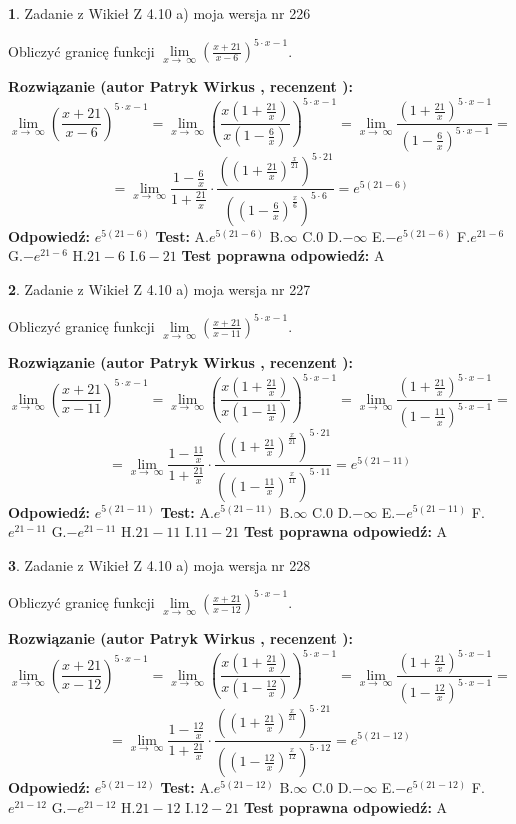 \documentclass[12pt, a4paper]{article}
\theoremstyle{definition} %
\newtheorem{zad}{}
\newcommand{\zadStart}[1]{\begin{zad}#1\newline}
\newcommand{\zadStop}{\end{zad}}
\newcommand{\rozwStart}[2]{\noindent \textbf{Rozwiązanie (autor #1 , recenzent #2): }\newline}
\newcommand{\rozwStop}{\newline}
\newcommand{\odpStart}{\noindent \textbf{Odpowiedź:}\newline}
\newcommand{\odpStop}{\newline}
\newcommand{\testStart}{\noindent \textbf{Test:}\newline}
\newcommand{\testStop}{\newline}
\newcommand{\kluczStart}{\noindent \textbf{Test poprawna odpowiedź:}\newline}
\newcommand{\kluczStop}{\newline}
\begin{document}
\zadStart{Zadanie z Wikieł Z 4.10 a) moja wersja nr 226}


Obliczyć granicę funkcji  $\lim\limits_{x\to\ \infty}(\frac{x+21}{x-6})^{5\cdot x-1}$.
\zadStop
\rozwStart{Patryk Wirkus}{}
$$\lim\limits_{x\to\ \infty}(\frac{x+21}{x-6})^{5\cdot x-1} = \lim\limits_{x\to\ \infty}(\frac{x(1+\frac{21}{x})}{x(1-\frac{6}{x})})^{5\cdot x-1}=\lim\limits_{x\to\ \infty}\frac{(1+\frac{21}{x})^{5\cdot x-1}}{(1-\frac{6}{x})^{5\cdot x-1}}=$$
$$=\lim\limits_{x\to\ \infty}\frac{1-\frac{6}{x}}{1+\frac{21}{x}}\cdot\frac{((1+\frac{21}{x})^{\frac{x}{21}})^{5\cdot21}}{((1-\frac{6}{x})^{\frac{x}{6}})^{5\cdot6}}=e^{5(21-6)}$$
\rozwStop
\odpStart
$e^{5(21-6)}$
\odpStop
\testStart
A.$e^{5(21-6)}$ B.$\infty$ C.$0$ D.$-\infty$ E.$-e^{5(21-6)}$
F.$e^{21-6}$ G.$-e^{21-6}$
H.$21-6$
I.$6-21$
\testStop
\kluczStart
A
\kluczStop



\zadStart{Zadanie z Wikieł Z 4.10 a) moja wersja nr 227}


Obliczyć granicę funkcji  $\lim\limits_{x\to\ \infty}(\frac{x+21}{x-11})^{5\cdot x-1}$.
\zadStop
\rozwStart{Patryk Wirkus}{}
$$\lim\limits_{x\to\ \infty}(\frac{x+21}{x-11})^{5\cdot x-1} = \lim\limits_{x\to\ \infty}(\frac{x(1+\frac{21}{x})}{x(1-\frac{11}{x})})^{5\cdot x-1}=\lim\limits_{x\to\ \infty}\frac{(1+\frac{21}{x})^{5\cdot x-1}}{(1-\frac{11}{x})^{5\cdot x-1}}=$$
$$=\lim\limits_{x\to\ \infty}\frac{1-\frac{11}{x}}{1+\frac{21}{x}}\cdot\frac{((1+\frac{21}{x})^{\frac{x}{21}})^{5\cdot21}}{((1-\frac{11}{x})^{\frac{x}{11}})^{5\cdot11}}=e^{5(21-11)}$$
\rozwStop
\odpStart
$e^{5(21-11)}$
\odpStop
\testStart
A.$e^{5(21-11)}$ B.$\infty$ C.$0$ D.$-\infty$ E.$-e^{5(21-11)}$
F.$e^{21-11}$ G.$-e^{21-11}$
H.$21-11$
I.$11-21$
\testStop
\kluczStart
A
\kluczStop



\zadStart{Zadanie z Wikieł Z 4.10 a) moja wersja nr 228}


Obliczyć granicę funkcji  $\lim\limits_{x\to\ \infty}(\frac{x+21}{x-12})^{5\cdot x-1}$.
\zadStop
\rozwStart{Patryk Wirkus}{}
$$\lim\limits_{x\to\ \infty}(\frac{x+21}{x-12})^{5\cdot x-1} = \lim\limits_{x\to\ \infty}(\frac{x(1+\frac{21}{x})}{x(1-\frac{12}{x})})^{5\cdot x-1}=\lim\limits_{x\to\ \infty}\frac{(1+\frac{21}{x})^{5\cdot x-1}}{(1-\frac{12}{x})^{5\cdot x-1}}=$$
$$=\lim\limits_{x\to\ \infty}\frac{1-\frac{12}{x}}{1+\frac{21}{x}}\cdot\frac{((1+\frac{21}{x})^{\frac{x}{21}})^{5\cdot21}}{((1-\frac{12}{x})^{\frac{x}{12}})^{5\cdot12}}=e^{5(21-12)}$$
\rozwStop
\odpStart
$e^{5(21-12)}$
\odpStop
\testStart
A.$e^{5(21-12)}$ B.$\infty$ C.$0$ D.$-\infty$ E.$-e^{5(21-12)}$
F.$e^{21-12}$ G.$-e^{21-12}$
H.$21-12$
I.$12-21$
\testStop
\kluczStart
A
\kluczStop
\end{document}
